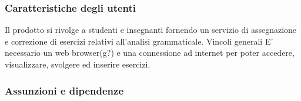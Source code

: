 \subsubsection{Caratteristiche degli utenti}
Il prodotto si rivolge a studenti e insegnanti fornendo un servizio di assegnazione e correzione di esercizi relativi all’analisi grammaticale.  
Vincoli generali
E’ necessario un web browser(g?) e una connessione ad internet per poter accedere, visualizzare, svolgere ed inserire esercizi.

\subsubsection{Assunzioni e dipendenze}

